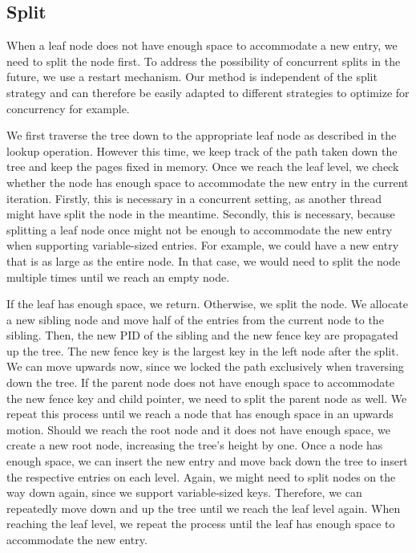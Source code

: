 \subsection*{Split}
\label{subsec:split}
When a leaf node does not have enough space to accommodate a new entry, we need to split the node first.
To address the possibility of concurrent splits in the future, we use a restart mechanism.
Our method is independent of the split strategy and can therefore be easily adapted to different strategies to optimize for concurrency for example.

We first traverse the tree down to the appropriate leaf node as described in the lookup operation.
However this time, we keep track of the path taken down the tree and keep the pages fixed in memory.
Once we reach the leaf level, we check whether the node has enough space to accommodate the new entry in the current iteration.
Firstly, this is necessary in a concurrent setting, as another thread might have split the node in the meantime.
Secondly, this is necessary, because splitting a leaf node once might not be enough to accommodate the new entry when supporting variable-sized entries.
For example, we could have a new entry that is as large as the entire node.
In that case, we would need to split the node multiple times until we reach an empty node.

If the leaf has enough space, we return.
Otherwise, we split the node.
We allocate a new sibling node and move half of the entries from the current node to the sibling.
Then, the new \ac{PID} of the sibling and the new fence key are propagated up the tree.
The new fence key is the largest key in the left node after the split.
We can move upwards now, since we locked the path exclusively when traversing down the tree.
If the parent node does not have enough space to accommodate the new fence key and child pointer, we need to split the parent node as well.
We repeat this process until we reach a node that has enough space in an upwards motion.
Should we reach the root node and it does not have enough space, we create a new root node, increasing the tree's height by one.
Once a node has enough space, we can insert the new entry and move back down the tree to insert the respective entries on each level.
Again, we might need to split nodes on the way down again, since we support variable-sized keys.
Therefore, we can repeatedly move down and up the tree until we reach the leaf level again.
When reaching the leaf level, we repeat the process until the leaf has enough space to accommodate the new entry.


